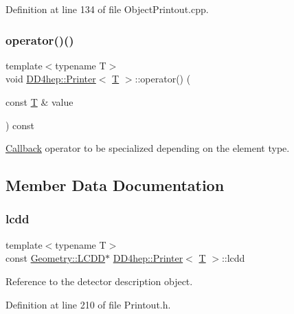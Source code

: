 Definition at line 134 of file Object\+Printout.\+cpp.

\hypertarget{struct_d_d4hep_1_1_printer_a51377db7fbaccd74e13ac13500b1192d}{}\label{struct_d_d4hep_1_1_printer_a51377db7fbaccd74e13ac13500b1192d} 
\subsubsection{\texorpdfstring{operator()()}{operator()()}\hspace{0.1cm}{\footnotesize\ttfamily [12/12]}}
{\footnotesize\ttfamily template$<$typename T$>$ \\
void \hyperlink{struct_d_d4hep_1_1_printer}{D\+D4hep\+::\+Printer}$<$ \hyperlink{class_t}{T} $>$\+::operator() (\begin{DoxyParamCaption}\item[{const \hyperlink{class_t}{T} \&}]{value }\end{DoxyParamCaption}) const}



\hyperlink{class_d_d4hep_1_1_callback}{Callback} operator to be specialized depending on the element type. 



\subsection{Member Data Documentation}
\hypertarget{struct_d_d4hep_1_1_printer_a09e1761c59664ca7953a3bead1f44dd4}{}\label{struct_d_d4hep_1_1_printer_a09e1761c59664ca7953a3bead1f44dd4} 
\subsubsection{\texorpdfstring{lcdd}{lcdd}}
{\footnotesize\ttfamily template$<$typename T$>$ \\
const \hyperlink{class_d_d4hep_1_1_geometry_1_1_l_c_d_d}{Geometry\+::\+L\+C\+DD}$\ast$ \hyperlink{struct_d_d4hep_1_1_printer}{D\+D4hep\+::\+Printer}$<$ \hyperlink{class_t}{T} $>$\+::lcdd}



Reference to the detector description object. 



Definition at line 210 of file Printout.\+h.

